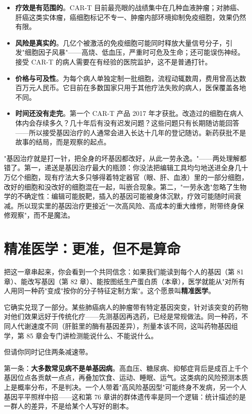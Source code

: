 \begin{itemize}[itemsep=2pt]
\item \textbf{疗效是有范围的}。CAR-T 目前最亮眼的战绩集中在几种血液肿瘤；对肺癌、肝癌这类实体瘤，癌细胞标记不专一、肿瘤内部环境抑制免疫细胞，效果仍然有限。
\item \textbf{风险是真实的}。几亿个被激活的免疫细胞可能同时释放大量信号分子，引发"细胞因子风暴"——高烧、低血压，严重时可危及生命；还可能误伤神经。接受 CAR-T 的病人需要在有经验的医院监护，这不是普通打针。
\item \textbf{价格与可及性}。为每个病人单独定制一批细胞，流程动辄数周，费用曾高达数百万元人民币。它目前在多数国家只用于其他疗法失败的病人，医保覆盖各地不同。
\item \textbf{时间还没有走完}。第一个 CAR-T 产品 2017 年才获批。改造过的细胞在病人体内会存续多久？几十年后有没有迟发问题？这些问题只有长期随访能回答——所以接受基因治疗的人通常会进入长达十几年的登记随访。新药获批不是故事的结局，而是观察的起点。
\end{itemize}

\begin{wuqu}
"基因治疗就是打一针，把全身的坏基因都改好，从此一劳永逸。"——两处理解都错了。第一，递送是基因治疗最大的瓶颈：你没法把编辑工具均匀地送进全身几十万亿个细胞，现有疗法大多只够得着特定器官（眼、肝、血液）里的一部分细胞，改好的细胞和没改好的细胞混在一起，叫嵌合现象。第二，"一劳永逸"忽略了生物学的不确定性：编辑可能脱靶，插入的基因可能被身体沉默，疗效可能随时间衰减。所以现实里的基因治疗更接近"一次高风险、高成本的重大维修，附带终身保修观察"，而不是魔法。
\end{wuqu}

\section{精准医学：更准，但不是算命}

把这一章串起来，你会看到一个共同信念：如果我们能读到每个人的基因（第 81 章）、能改写基因（第 82 章）、能按图纸生产蛋白质（本章），医学就能从"对所有人用同一种药"变成"按你的分子特征定制方案"。这个愿景叫\textbf{精准医学}。

它确实兑现了一部分。某些肺癌病人的肿瘤带有特定基因突变，针对该突变的药物对他们效果远好于传统化疗——先测基因再选药，已经是常规做法。同一种药，不同人代谢速度不同（肝脏里的酶有基因差异），剂量本该不同，这叫药物基因组学，第 85 章会专门讲检测能说什么、不能说什么。

但请你同时记住两条减速带。

第一条：\textbf{大多数常见病不是单基因病}。高血压、糖尿病、抑郁症背后是成百上千个基因位点各贡献一点点，再叠加饮食、运动、睡眠、运气。这类病的风险预测本质上是概率分布，不是判决。一个人带着"高风险基因型"可能终身不发病，另一个人基因平平照样中招——这和第 76 章讲的群体遗传率是同一个逻辑：统计描述的是一群人的差异，不是给某个人写好的剧本。

